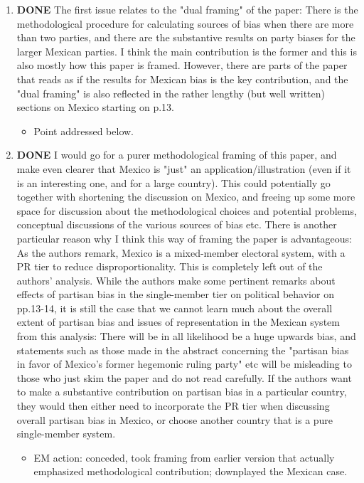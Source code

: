 \documentclass{article}
\begin{document}
\begin{enumerate}
\item {\bfseries\sffamily DONE} The first issue relates to the "dual framing" of the paper: There is the methodological procedure for calculating sources of bias when there are more than two parties, and there are the substantive results on party biases for the larger Mexican parties. I think the main contribution is the former and this is also mostly how this paper is framed. However, there are parts of the paper that reads as if the results for Mexican bias is the key contribution, and the "dual framing" is also reflected in the rather lengthy (but well written) sections on Mexico starting on p.13.
\label{sec:orgheadline6}
\begin{itemize}
\item Point addressed below.
\end{itemize}
\item {\bfseries\sffamily DONE} I would go for a purer methodological framing of this paper, and make even clearer that Mexico is "just" an application/illustration (even if it is an interesting one, and for a large country). This could potentially go together with shortening the discussion on Mexico, and  freeing up some more space for discussion about the methodological choices and potential problems, conceptual discussions of the various sources of bias etc. There is another particular reason why I think this way of framing the paper is advantageous: As the authors remark, Mexico is a mixed-member electoral system, with a PR tier to reduce disproportionality. This is completely left out of the authors' analysis. While the authors make some pertinent remarks about effects of partisan bias in the single-member tier on political behavior on pp.13-14, it is still the case that we cannot learn much about the overall extent of partisan bias and issues of representation in the Mexican system from this analysis: There will be in all likelihood be a huge upwards bias, and statements such as those made in the abstract concerning the "partisan bias in favor of Mexico's former hegemonic ruling party" etc will be misleading to those who just skim the paper and do not read carefully. If the authors want to make a substantive contribution on partisan bias in a particular country, they would then either need to incorporate the PR tier when discussing overall partisan bias in Mexico, or choose another country  that is a pure single-member system.
\label{sec:orgheadline7}
\begin{itemize}
\item EM action: conceded, took framing from earlier version that actually emphasized methodological contribution; downplayed the Mexican case.

\end{itemize}
\end{enumerate}
\end{document}
